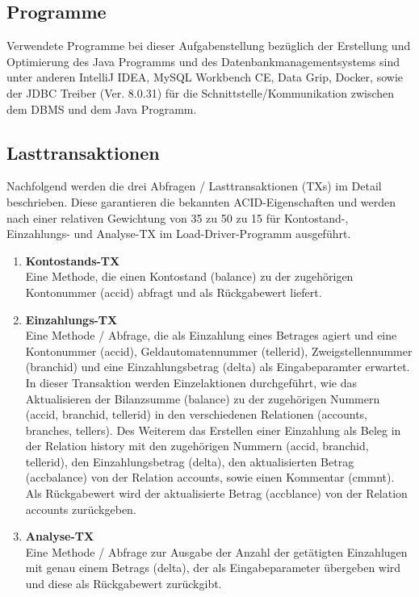 \subsection{Programme}\label{subsec:programme}
Verwendete Programme bei dieser Aufgabenstellung bezüglich der Erstellung und Optimierung des Java Programms und des Datenbankmanagementsystems sind unter anderen IntelliJ IDEA, MySQL Workbench CE, Data Grip, Docker, sowie der JDBC Treiber (Ver. 8.0.31) für die Schnittstelle/Kommunikation zwischen dem DBMS und dem Java Programm.
\subsection{Lasttransaktionen}\label{subsec:lasttransaktionen}
Nachfolgend werden die drei Abfragen / Lasttransaktionen (TXs) im Detail beschrieben.
Diese garantieren die bekannten ACID-Eigenschaften und werden nach einer relativen Gewichtung von 35 zu 50 zu 15 für Kontostand-, Einzahlungs- und Analyse-TX im Load-Driver-Programm ausgeführt.
\begin{enumerate}
    \item \textbf{Kontostands-TX} \\
    Eine Methode, die einen Kontostand (balance) zu der zugehörigen Kontonummer (accid) abfragt und als Rückgabewert liefert.
    \item \textbf{Einzahlungs-TX} \\
    Eine Methode / Abfrage, die als Einzahlung eines Betrages agiert und eine Kontonummer (accid), Geldautomatennummer (tellerid), Zweigstellennummer (branchid) und eine Einzahlungsbetrag (delta) als Eingabeparamter erwartet.
    In dieser Transaktion werden Einzelaktionen durchgeführt, wie das Aktualisieren der Bilanzsumme (balance) zu der zugehörigen Nummern (accid, branchid, tellerid) in den verschiedenen Relationen (accounts, branches, tellers).
    Des Weiterem das Erstellen einer Einzahlung als Beleg in der Relation history mit den zugehörigen Nummern (accid, branchid, tellerid), den Einzahlungsbetrag (delta), den aktualisierten Betrag (accbalance) von der Relation accounts, sowie einen Kommentar (cmmnt).
    Als Rückgabewert wird der aktualisierte Betrag (accblance) von der Relation accounts zurückgeben.
    \item \textbf{Analyse-TX} \\
    Eine Methode / Abfrage zur Ausgabe der Anzahl der getätigten Einzahlugen mit genau einem Betrags (delta), der als Eingabeparameter übergeben wird und diese als Rückgabewert zurückgibt.
\end{enumerate}
